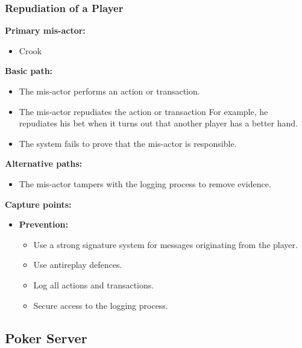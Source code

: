 \documentclass[a4paper,11pt]{report}
\begin{document}
\subsubsection{Repudiation of a Player}
\label{PlayerCasesR}
\label{Repudiation of a Player}
\textbf{Primary mis-actor:}
\begin{itemize}
\item Crook
\end{itemize}
\textbf{Basic path:}
\begin{itemize}
\item The mis-actor performs an action or transaction.
\item The mis-actor repudiates the action or transaction For example, he repudiates his bet when it turns out that another player has a better hand.
\item The system fails to prove that the mis-actor is responsible.
\end{itemize}
\textbf{Alternative paths:}
\begin{itemize}
\item The mis-actor tampers with the logging process to remove evidence.
\end{itemize}
\textbf{Capture points:}
\begin{itemize}
\item \textbf{Prevention:}
\begin{itemize}
\item Use a strong signature system for messages originating from the player.
\item Use antireplay defences.
\item Log all actions and transactions.
\item Secure access to the logging process.
\end{itemize}
\end{itemize}

\subsection{Poker Server}
\label{PokerServerCases}
\end{document}
